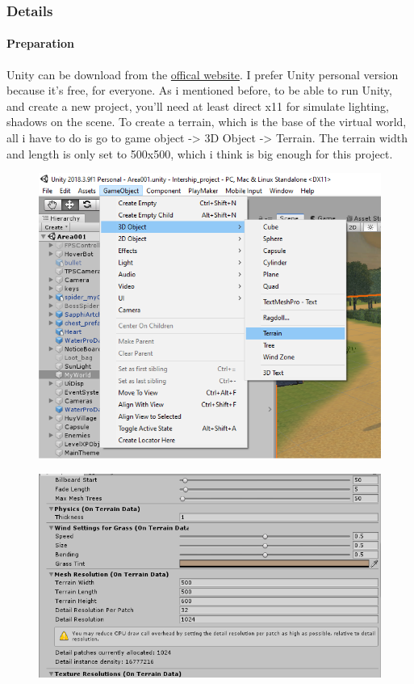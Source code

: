 \documentclass[a4paper, 13pt]{extarticle}
\begin{document}
 		 
 		 \newpage
 		  \subsubsection{Details}
 		  \paragraph{Preparation}
 		  Unity can be download from the \href{https://store.unity.com/}{offical website}. I prefer Unity personal version because it's free, for everyone. As i mentioned before, to be able to run Unity, and create a new project, you'll need at least direct x11 for simulate lighting, shadows on the scene. To create a terrain, which is the base of the virtual world, all i have to do is go to game object -> 3D Object -> Terrain. The terrain width and length is only set to 500x500, which i think is big enough for this project.  \begin{figure}[h]
 		  	\centering
 		  	\begin{minipage}{.4\textwidth}
 		  		\centering
 		  		\includegraphics[width=1\linewidth]{intructions/1.png}
 		  		\label{fig:test2}
 		  	\end{minipage}
 		  	\begin{minipage}{.4\textwidth}
 		  		\centering
 		  		\includegraphics[width=1.4\linewidth]{intructions/2.png}

\end{minipage}
\end{figure}
\end{document}
